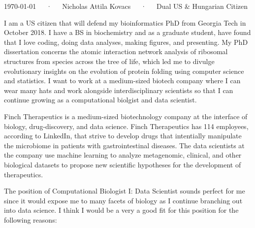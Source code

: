 \documentclass[11pt, letterpaper]{CV_latex_class}
\begin{document}
\makecvheader

\makecvfooter
  {\today~~~·~~~Nicholas Attila Kovacs~~~·~~~Dual US \& Hungarian Citizen}

\makelettertitle

\begin{cvletter}

\vspace{-6.5em}

I am a US citizen that will defend my bioinformatics PhD from Georgia Tech in October 2018. I have a BS in biochemistry and as a graduate student, have found that I love coding, doing data analyses, making figures, and presenting. My PhD dissertation concerns the atomic interaction network analysis of ribosomal structures from species across the tree of life, which led me to divulge evolutionary insights on the evolution of protein folding using computer science and statistics. I want to work at a medium-sized biotech company where I can wear many hats and work alongside interdisciplinary scientists so that I can continue growing as a computational biolgist and data scientist. 

Finch Therapeutics is a medium-sized biotechnology company at the interface of biology, drug-discovery, and data science. Finch Therapeutics has 114 employees, according to LinkedIn, that strive to develop drugs that intentially manipulate the microbiome in patients with gastrointestinal diseases. The data scientists at the company use machine learning to analyze metagenomic, clinical, and other biological datasets to propose new scientific hypotheses for the development of therapeutics. 

The position of Computational Biologist I: Data Scientist sounds perfect for me since it would expose me to many facets of biology as I continue branching out into data science. I think I would be a very a good fit for this position for the following reasons:


\end{cvletter}
\end{document}
